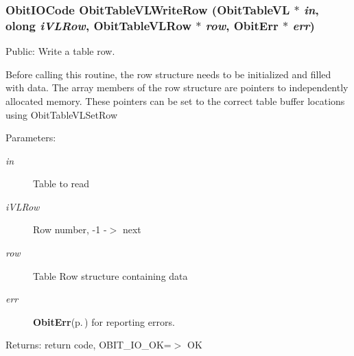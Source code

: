 \subsubsection{\setlength{\rightskip}{0pt plus 5cm}Obit\-IOCode Obit\-Table\-VLWrite\-Row ({\bf Obit\-Table\-VL} $\ast$ {\em in}, {\bf olong} {\em i\-VLRow}, {\bf Obit\-Table\-VLRow} $\ast$ {\em row}, {\bf Obit\-Err} $\ast$ {\em err})}\label{ObitTableVL_8c_a24}


Public: Write a table row. 

Before calling this routine, the row structure needs to be initialized and filled with data. The array members of the row structure are pointers to independently allocated memory. These pointers can be set to the correct table buffer locations using Obit\-Table\-VLSet\-Row \begin{Desc}
\item[Parameters:]
\begin{description}
\item[{\em in}]Table to read \item[{\em i\-VLRow}]Row number, -1 -$>$ next \item[{\em row}]Table Row structure containing data \item[{\em err}]{\bf Obit\-Err}{\rm (p.\,\pageref{structObitErr})} for reporting errors. \end{description}
\end{Desc}
\begin{Desc}
\item[Returns:]return code, OBIT\_\-IO\_\-OK=$>$ OK \end{Desc}
